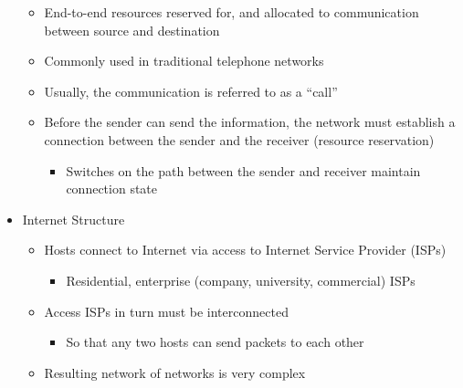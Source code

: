 \begin{itemize}
    \begin{itemize}

      \item End-to-end resources reserved for, and allocated to communication between source and destination

      \item Commonly used in traditional telephone networks

      \item Usually, the communication is referred to as a ``call''

      \item Before the sender can send the information, the network must establish a connection between the sender and the receiver (resource reservation)

        \begin{itemize}

          \item Switches on the path between the sender and receiver maintain connection state

        \end{itemize}

    \end{itemize}

  \item Internet Structure

    \begin{itemize}

      \item Hosts connect to Internet via access to Internet Service Provider (ISPs)

        \begin{itemize}

          \item Residential, enterprise (company, university, commercial) ISPs

        \end{itemize}

      \item Access ISPs in turn must be interconnected

        \begin{itemize}

          \item So that any two hosts can send packets to each other

        \end{itemize}

      \item Resulting network of networks is very complex


\end{itemize}
\end{itemize}

